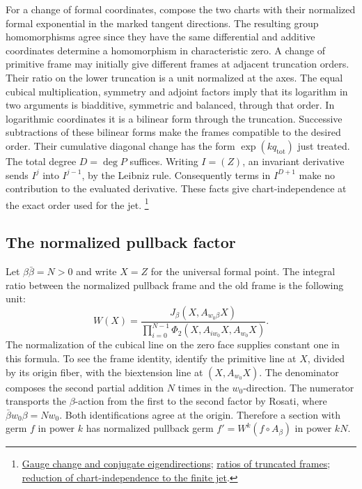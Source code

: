 For a change of formal coordinates, compose the two charts with
their normalized formal exponential in the marked tangent
directions. The resulting group homomorphisms agree since they
have the same differential and additive coordinates determine a
homomorphism in characteristic zero. A change of primitive frame
may initially give different frames at adjacent truncation orders.
Their ratio on the lower truncation is a unit normalized at the
axes. The equal cubical multiplication, symmetry and adjoint
factors imply that its logarithm in two arguments is biadditive,
symmetric and balanced, through that order. In logarithmic
coordinates it is a bilinear form through the truncation. Successive
subtractions of these bilinear forms make the frames compatible
to the desired order. Their cumulative diagonal change has the form
\(\exp(kq_{\mathrm{tot}})\) just treated. The total degree
\(D=\deg P\) suffices. Writing \(I=(Z)\), an invariant derivative
sends \(I^j\) into \(I^{j-1}\), by the Leibniz rule. Consequently
terms in \(I^{D+1}\) make no contribution to the evaluated
derivative. These facts give chart-independence at the exact order
used for the jet.
\footnote{\href{https://github.com/ChristianKudeba/alpoge-rh-verification/blob/alpoge-source-7cbf7a0c/src/Development/AbelianVarietyTheory/Proofs/FormalGroupCharts/CanonGaugeIndependenceHarmonic.lean}{Gauge change and conjugate eigendirections};
\href{https://github.com/ChristianKudeba/alpoge-rh-verification/blob/alpoge-source-7cbf7a0c/src/Formalism/SharpRestriction/Divisibility/GeneratorPowers/FrRatio.lean}{ratios of truncated frames};
\href{https://github.com/ChristianKudeba/alpoge-rh-verification/blob/alpoge-source-7cbf7a0c/src/Formalism/SharpRestriction/Divisibility/GeneratorPowers/CIndVerb.lean}{reduction of chart-independence to the finite jet}.}

\subsection{The normalized pullback factor}

Let \(\beta\bar\beta=N>0\) and write \(X=Z\) for the universal
formal point. The integral ratio between the normalized pullback
frame and the old frame is the following unit:
\[
 W(X)=
 \frac{J_\beta(X,A_{w_0\beta}X)}
 {\prod_{i=0}^{N-1}\Phi_2(X,A_{iw_0}X,A_{w_0}X)} .
\]
The normalization of the cubical line on the zero face supplies
constant one in this formula. To see the frame identity, identify
the primitive line at \(X\), divided by its origin fiber, with the
biextension line at \((X,A_{w_0}X)\).
The denominator composes the second partial addition
\(N\) times in the \(w_0\)-direction. The numerator transports the
\(\beta\)-action from the first to the second factor by Rosati,
where \(\bar\beta w_0\beta=Nw_0\). Both identifications agree at the
origin. Therefore a section with germ \(f\) in power \(k\) has
normalized pullback germ \(f'=W^k(f\circ A_\beta)\) in power \(kN\).

